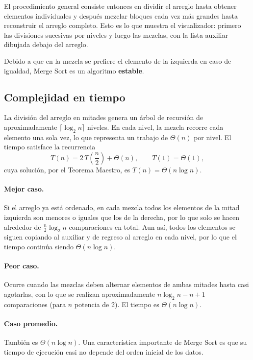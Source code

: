 El procedimiento general consiste entonces en dividir el arreglo hasta obtener elementos individuales y después mezclar bloques cada vez más grandes hasta reconstruir el arreglo completo. Esto es lo que muestra el visualizador: primero las divisiones sucesivas por niveles y luego las mezclas, con la lista auxiliar dibujada debajo del arreglo.

Debido a que en la mezcla se prefiere el elemento de la izquierda en caso de igualdad, Merge Sort es un algoritmo \textbf{estable}.

\subsection{Complejidad en tiempo}

La división del arreglo en mitades genera un árbol de recursión de aproximadamente $\lceil \log_2 n \rceil$ niveles. En cada nivel, la mezcla recorre cada elemento una sola vez, lo que representa un trabajo de $\Theta(n)$ por nivel. El tiempo satisface la recurrencia
\[
  T(n) = 2\,T\!\left(\frac{n}{2}\right) + \Theta(n), \qquad T(1) = \Theta(1),
\]
cuya solución, por el Teorema Maestro, es $T(n) = \Theta(n \log n)$.

\paragraph{Mejor caso.} Si el arreglo ya está ordenado, en cada mezcla todos los elementos de la mitad izquierda son menores o iguales que los de la derecha, por lo que solo se hacen alrededor de $\frac{n}{2}\log_2 n$ comparaciones en total. Aun así, todos los elementos se siguen copiando al auxiliar y de regreso al arreglo en cada nivel, por lo que el tiempo continúa siendo $\Theta(n \log n)$.

\paragraph{Peor caso.} Ocurre cuando las mezclas deben alternar elementos de ambas mitades hasta casi agotarlas, con lo que se realizan aproximadamente $n\log_2 n - n + 1$ comparaciones (para $n$ potencia de 2). El tiempo es $\Theta(n \log n)$.

\paragraph{Caso promedio.} También es $\Theta(n \log n)$. Una característica importante de Merge Sort es que su tiempo de ejecución casi no depende del orden inicial de los datos.

